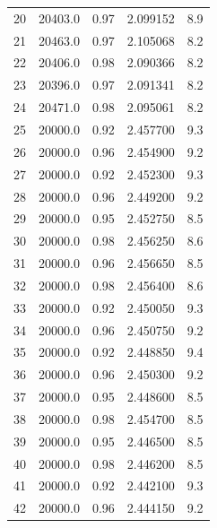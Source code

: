 \begin{table}[H]
{\begin{tabular}{lcccc}
20  &      20403.0 &        0.97 &           2.099152 &              8.9 \\
21  &      20463.0 &        0.97 &           2.105068 &              8.2 \\
22  &      20406.0 &        0.98 &           2.090366 &              8.2 \\
23  &      20396.0 &        0.97 &           2.091341 &              8.2 \\
24  &      20471.0 &        0.98 &           2.095061 &              8.2 \\
25  &      20000.0 &        0.92 &           2.457700 &              9.3 \\
26  &      20000.0 &        0.96 &           2.454900 &              9.2 \\
27  &      20000.0 &        0.92 &           2.452300 &              9.3 \\
28  &      20000.0 &        0.96 &           2.449200 &              9.2 \\
29  &      20000.0 &        0.95 &           2.452750 &              8.5 \\
30  &      20000.0 &        0.98 &           2.456250 &              8.6 \\
31  &      20000.0 &        0.96 &           2.456650 &              8.5 \\
32  &      20000.0 &        0.98 &           2.456400 &              8.6 \\
33  &      20000.0 &        0.92 &           2.450050 &              9.3 \\
34  &      20000.0 &        0.96 &           2.450750 &              9.2 \\
35  &      20000.0 &        0.92 &           2.448850 &              9.4 \\
36  &      20000.0 &        0.96 &           2.450300 &              9.2 \\
37  &      20000.0 &        0.95 &           2.448600 &              8.5 \\
38  &      20000.0 &        0.98 &           2.454700 &              8.5 \\
39  &      20000.0 &        0.95 &           2.446500 &              8.5 \\
40  &      20000.0 &        0.98 &           2.446200 &              8.5 \\
41  &      20000.0 &        0.92 &           2.442100 &              9.3 \\
42  &      20000.0 &        0.96 &           2.444150 &              9.2 \\

\end{tabular}}
\end{table}
